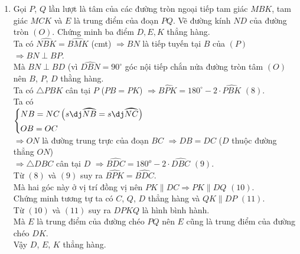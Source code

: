 \begin{bt}
{\begin{enumerate}
	Từ $(6) $ và $(7) $ suy ra $BH=BK$.\\
	Mà $BHIK$ là hình bình hành nên $BHIK$ là hình thoi.
	\item	Gọi $P$, $Q$ lần lượt là tâm của các đường tròn ngoại tiếp tam giác $MBK$, tam giác $MCK$ và $E$ là trung điểm của đoạn $PQ$. Vẽ đường kính $ND$ của đường tròn $\left(O \right)$. Chứng minh ba điểm $D,E,K$ thẳng hàng.\\
	Ta có $\widehat{NBK}=\widehat{BMK}$ (cmt)
	$\Rightarrow BN$ là tiếp tuyến tại $B$ của $(P)$
	$\Rightarrow BN\perp BP$.\\
	Mà $BN\perp BD$ (vì $\widehat{DBN}= 90^\circ$ góc nội tiếp chắn nửa đường tròn tâm $(O)$\\
	nên $B$, $P$, $D$ thằng hàng.\\
	Ta có $\triangle PBK$ cân tại $P$ ($PB=PK$)
	$\Rightarrow \widehat{BPK}= 180^\circ -2\cdot \widehat{PBK}$ \qquad	$(8)$.\\
	Ta có \\
	$\heva{& NB=NC\left(sđ\wideparen{NB}=sđ\wideparen{NC} \right) \\& OB=OC }$\\
	$\Rightarrow ON$ là đường trung trực của đoạn $BC$
	$\Rightarrow DB=DC$ ($D$ thuộc đường thẳng $ON$)\\
	$\Rightarrow \triangle DBC$ cân tại $D$
	$\Rightarrow \widehat{BDC}={{180}^{o}}-2\cdot \widehat{DBC}$ \qquad	$(9)$.\\
	Từ $(8)$ và $(9) $ suy ra $\widehat{BPK}=\widehat{BDC}$.\\
	Mà hai góc này ở vị trí đồng vị nên $PK\parallel DC$$\Rightarrow PK\parallel DQ$ \qquad	$(10)$.\\
	Chứng minh tương tự ta có $C$, $Q$, $D$ thẳng hàng và $QK\parallel DP$ \qquad $(11)$.\\
	Từ $(10)$ và $(11)$ suy ra $DPKQ$ là hình bình hành.\\
	Mà $E$ là trung điểm của đường chéo $PQ$ nên $E$ cũng là trung điểm của đường chéo $DK$.\\
	Vậy $D$, $E$, $K$ thẳng hàng.
	
\end{enumerate}
}
\end{bt}

